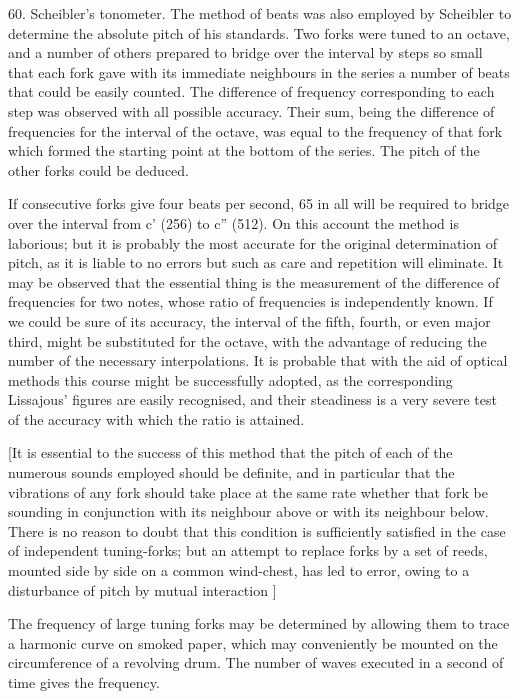 60.  Scheibler's tonometer.
The method of beats was also employed by Scheibler to determine the
absolute pitch of his standards. Two forks were tuned to an octave, and a
number of others prepared to bridge over the interval by steps so small that
each fork gave with its immediate neighbours in the series a number of beats
that could be easily counted. The difference of frequency corresponding to each
step was observed with all possible accuracy. Their sum, being the difference
of frequencies for the interval of the octave, was equal to the frequency of
that fork which formed the starting point at the bottom of the series. The
pitch of the other forks could be deduced.

If consecutive forks give four beats per second, 65 in all will be required to
bridge over the interval from c' (256) to c'' (512). On this account the method
is laborious; but it is probably the most accurate for the original
determination of pitch, as it is liable to no errors but such as care and
repetition will eliminate. It may be observed that the essential thing is the
measurement of the difference of frequencies for two notes, whose ratio of
frequencies is independently known. If we could be sure of its accuracy, the
interval of the fifth, fourth, or even major third, might be substituted for
the octave, with the advantage of reducing the number of the necessary
interpolations. It is probable that with the aid of optical methods this course
might be successfully adopted, as the corresponding Lissajous' figures are
easily recognised, and their steadiness is a very severe test of the accuracy
with which the ratio is attained.

[It is essential to the success of this method that the pitch of each of the
numerous sounds employed should be definite, and in particular that the
vibrations of any fork should take place at the same rate whether that fork be
sounding in conjunction with its neighbour above or with its neighbour below.
There is no reason to doubt that this condition is sufficiently satisfied in
the case of independent tuning-forks; but an attempt to replace forks by a set
of reeds, mounted side by side on a common wind-chest, has led to error, owing
to a disturbance of pitch by mutual interaction ]

The frequency of large tuning forks may be determined by allowing them to trace
a harmonic curve on smoked paper, which may conveniently be mounted on the
circumference of a revolving drum. The number of waves executed in a second of
time gives the frequency.

